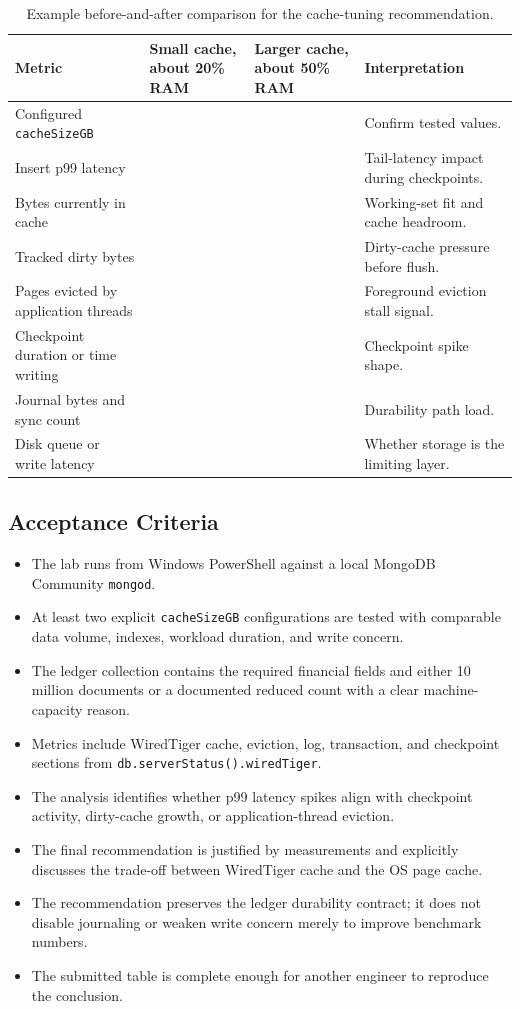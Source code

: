 \begin{table}[H]
\centering
\caption{Example before-and-after comparison for the cache-tuning recommendation.}
\label{tab:ch1-capstone-metrics}
\begin{tabular}{@{}p{4.2cm}p{3.2cm}p{3.2cm}p{3.4cm}@{}}
\toprule
\textbf{Metric} & \textbf{Small cache, about 20\% RAM} & \textbf{Larger cache, about 50\% RAM} & \textbf{Interpretation} \\
\midrule
Configured \texttt{cacheSizeGB} &  &  & Confirm tested values. \\
Insert p99 latency &  &  & Tail-latency impact during checkpoints. \\
Bytes currently in cache &  &  & Working-set fit and cache headroom. \\
Tracked dirty bytes &  &  & Dirty-cache pressure before flush. \\
Pages evicted by application threads &  &  & Foreground eviction stall signal. \\
Checkpoint duration or time writing &  &  & Checkpoint spike shape. \\
Journal bytes and sync count &  &  & Durability path load. \\
Disk queue or write latency &  &  & Whether storage is the limiting layer. \\
\bottomrule
\end{tabular}
\end{table}

\subsection*{Acceptance Criteria}
\begin{itemize}
    \item The lab runs from Windows PowerShell against a local MongoDB Community \texttt{mongod}.
    \item At least two explicit \texttt{cacheSizeGB} configurations are tested with comparable data volume, indexes, workload duration, and write concern.
    \item The ledger collection contains the required financial fields and either 10 million documents or a documented reduced count with a clear machine-capacity reason.
    \item Metrics include WiredTiger cache, eviction, log, transaction, and checkpoint sections from \texttt{db.serverStatus().wiredTiger}.
    \item The analysis identifies whether p99 latency spikes align with checkpoint activity, dirty-cache growth, or application-thread eviction.
    \item The final recommendation is justified by measurements and explicitly discusses the trade-off between WiredTiger cache and the OS page cache.
    \item The recommendation preserves the ledger durability contract; it does not disable journaling or weaken write concern merely to improve benchmark numbers.
    \item The submitted table is complete enough for another engineer to reproduce the conclusion.
\end{itemize}


